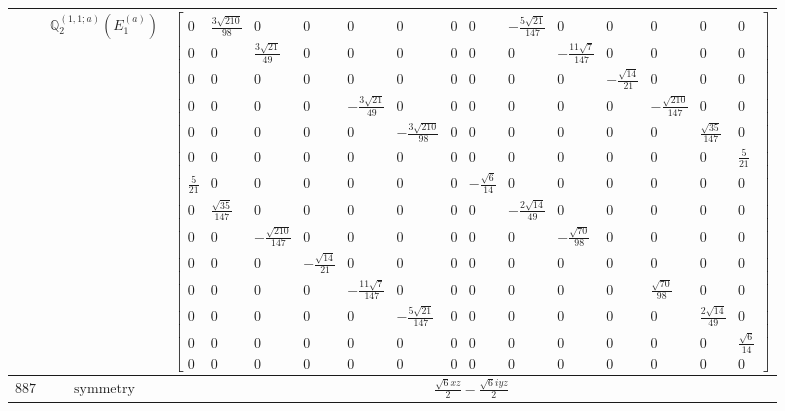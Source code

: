 \documentclass[fleqn,8pt,landscape]{jsarticle}
\begin{document}
\begin{longtable}{ccc}
$  $ & $ \mathbb{Q}_{2}^{(1,1;a)}(E_{1}^{(a)}) $ & $ \begin{bmatrix} 0 & \frac{3 \sqrt{210}}{98} & 0 & 0 & 0 & 0 & 0 & 0 & - \frac{5 \sqrt{21}}{147} & 0 & 0 & 0 & 0 & 0 \\ 0 & 0 & \frac{3 \sqrt{21}}{49} & 0 & 0 & 0 & 0 & 0 & 0 & - \frac{11 \sqrt{7}}{147} & 0 & 0 & 0 & 0 \\ 0 & 0 & 0 & 0 & 0 & 0 & 0 & 0 & 0 & 0 & - \frac{\sqrt{14}}{21} & 0 & 0 & 0 \\ 0 & 0 & 0 & 0 & - \frac{3 \sqrt{21}}{49} & 0 & 0 & 0 & 0 & 0 & 0 & - \frac{\sqrt{210}}{147} & 0 & 0 \\ 0 & 0 & 0 & 0 & 0 & - \frac{3 \sqrt{210}}{98} & 0 & 0 & 0 & 0 & 0 & 0 & \frac{\sqrt{35}}{147} & 0 \\ 0 & 0 & 0 & 0 & 0 & 0 & 0 & 0 & 0 & 0 & 0 & 0 & 0 & \frac{5}{21} \\ \frac{5}{21} & 0 & 0 & 0 & 0 & 0 & 0 & - \frac{\sqrt{6}}{14} & 0 & 0 & 0 & 0 & 0 & 0 \\ 0 & \frac{\sqrt{35}}{147} & 0 & 0 & 0 & 0 & 0 & 0 & - \frac{2 \sqrt{14}}{49} & 0 & 0 & 0 & 0 & 0 \\ 0 & 0 & - \frac{\sqrt{210}}{147} & 0 & 0 & 0 & 0 & 0 & 0 & - \frac{\sqrt{70}}{98} & 0 & 0 & 0 & 0 \\ 0 & 0 & 0 & - \frac{\sqrt{14}}{21} & 0 & 0 & 0 & 0 & 0 & 0 & 0 & 0 & 0 & 0 \\ 0 & 0 & 0 & 0 & - \frac{11 \sqrt{7}}{147} & 0 & 0 & 0 & 0 & 0 & 0 & \frac{\sqrt{70}}{98} & 0 & 0 \\ 0 & 0 & 0 & 0 & 0 & - \frac{5 \sqrt{21}}{147} & 0 & 0 & 0 & 0 & 0 & 0 & \frac{2 \sqrt{14}}{49} & 0 \\ 0 & 0 & 0 & 0 & 0 & 0 & 0 & 0 & 0 & 0 & 0 & 0 & 0 & \frac{\sqrt{6}}{14} \\ 0 & 0 & 0 & 0 & 0 & 0 & 0 & 0 & 0 & 0 & 0 & 0 & 0 & 0 \end{bmatrix} $ \\ \hline
$ 887 $ & $ \text{symmetry} $ & $ \frac{\sqrt{6} x z}{2} - \frac{\sqrt{6} i y z}{2} $ \\

\end{longtable}
\end{document}

